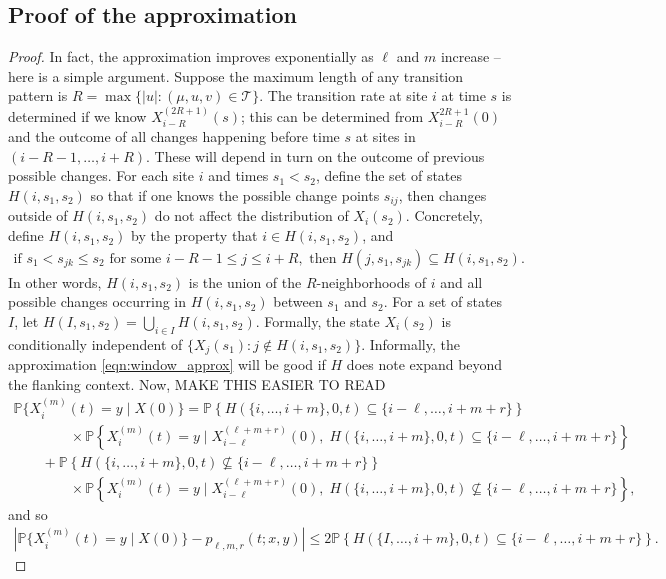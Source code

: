 \documentclass{article}
\renewcommand{\P}{\mathbb{P}}
\newcommand{\calT}{\mathcal{T}}  %
\newcommand{\st}{\colon}  %
\theoremstyle{plain}
\theoremstyle{definition}
\begin{document}
\subsection*{Proof of the approximation}

\begin{proof}

In fact, the approximation improves exponentially as $\ell$ and $m$ increase --
here is a simple argument.
Suppose the maximum length of any transition pattern is $R = \max\{ |u| : (\mu,u,v) \in \calT \}$.
The transition rate at site $i$ at time $s$ is determined if we know $X_{i-R}^{(2R+1)}(s)$;
this can be determined from $X_{i-R}^{2R+1}(0)$ and the outcome of all changes happening before time $s$ at sites in $(i-R-1, \ldots, i+R)$.
These will depend in turn on the outcome of previous possible changes.
For each site $i$ and times $s_1 < s_2$, define the set of states $H(i,s_1,s_2)$ 
so that if one knows the possible change points $s_{ij}$,
then changes outside of $H(i,s_1,s_2)$ do not affect the distribution of $X_i(s_2)$.
Concretely, define $H(i,s_1,s_2)$ by the property that $i \in H(i,s_1,s_2)$, and
\begin{gather}
  \text{if } s_1 < s_{jk} \le s_2 \text{ for some } i-R-1 \le j \le i+R, \text{ then } H(j,s_1,s_{jk}) \subseteq H(i,s_1,s_2) .
\end{gather}
In other words, $H(i,s_1,s_2)$ is the union of the $R$-neighborhoods of $i$ and all possible changes occurring in $H(i,s_1,s_2)$ between $s_1$ and $s_2$.
For a set of states $I$, let $H(I,s_1,s_2) = \bigcup_{i\in I} H(i,s_1,s_2)$.
Formally, the state $X_i(s_2)$ is conditionally independent of $\{X_j(s_1) \st j \notin H(i,s_1,s_2)\}$.
Informally, the approximation \eqref{eqn:window_approx} will be good if $H$ does note expand beyond the flanking context.
Now, MAKE THIS EASIER TO READ
\begin{multline}
  \P\{ X_i^{(m)}(t) = y \mid X(0) \} 
  = \P\left\{ H(\{i,\ldots,i+m\},0,t)\subseteq\{i-\ell,\ldots,i+m+r\} \right\} \\
   \qquad \qquad {} \times \P\left\{ X_i^{(m)}(t) = y \mid X_{i-\ell}^{(\ell+m+r)}(0), \; H(\{i,\ldots,i+m\},0,t)\subseteq\{i-\ell,\ldots,i+m+r\} \right\} \\
     \qquad {} + \P\left\{ H(\{i,\ldots,i+m\},0,t)\nsubseteq\{i-\ell,\ldots,i+m+r\} \right\}  \\
   \qquad\qquad {} \times \P\left\{ X_i^{(m)}(t) = y \mid X_{i-\ell}^{(\ell+m+r)}(0), \; H(\{i,\ldots,i+m\},0,t)\nsubseteq\{i-\ell,\ldots,i+m+r\} \right\} ,
\end{multline}
and so
\begin{align} \label{eqn:prob_approx}
  \left| \P\{ X_i^{(m)}(t) = y \mid X(0) \} - p_{\ell,m,r}(t;x,y) \right| \le 2 \P\left\{  H(\{I,\ldots,i+m\},0,t)\subseteq\{i-\ell,\ldots,i+m+r\} \right\}.
\end{align}


\end{proof}
\end{document}

